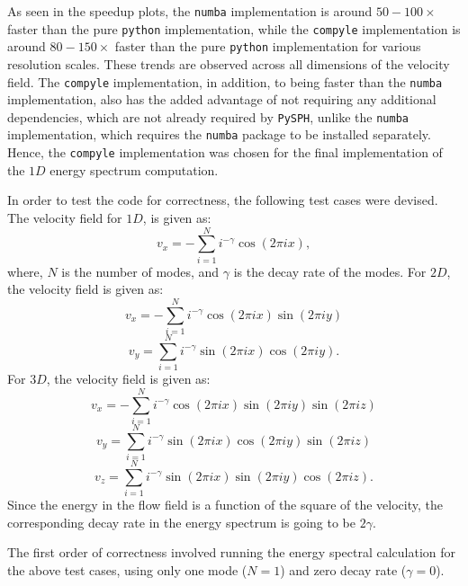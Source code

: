 As seen in the speedup plots, the \texttt{numba} implementation is around $50-100\times$ faster than the pure \texttt{python} implementation, while the \texttt{compyle} implementation is around $80-150\times$ faster than the pure \texttt{python} implementation for various resolution scales. These trends are observed across all dimensions of the velocity field. The \texttt{compyle} implementation, in addition, to being faster than the \texttt{numba} implementation, also has the added advantage of not requiring any additional dependencies, which are not already required by \texttt{PySPH}, unlike the \texttt{numba} implementation, which requires the \texttt{numba} package to be installed separately. Hence, the \texttt{compyle} implementation was chosen for the final implementation of the $1D$ energy spectrum computation.

In order to test the code for correctness, the following test cases were devised. The velocity field for $1D$, is given as:
\begin{equation}
    v_x = - \sum_{i=1}^{N} i^{-\gamma} \cos(2 \pi i x),
\end{equation}
where, $N$ is the number of modes, and $\gamma$ is the decay rate of the modes.
For $2D$, the velocity field is given as:
\begin{equation}
    v_x = - \sum_{i=1}^{N} i^{-\gamma} \cos(2 \pi i x) \sin(2 \pi i y)
\end{equation}
\begin{equation}
    v_y = \sum_{i=1}^{N} i^{-\gamma} \sin(2 \pi i x) \cos(2 \pi i y).
\end{equation}
For $3D$, the velocity field is given as:
\begin{equation}
    v_x = - \sum_{i=1}^{N} i^{-\gamma} \cos(2 \pi i x) \sin(2 \pi i y) \sin(2 \pi i z)
\end{equation}
\begin{equation}
    v_y = \sum_{i=1}^{N} i^{-\gamma} \sin(2 \pi i x) \cos(2 \pi i y) \sin(2 \pi i z)
\end{equation}
\begin{equation}
    v_z = \sum_{i=1}^{N} i^{-\gamma} \sin(2 \pi i x) \sin(2 \pi i y) \cos(2 \pi i z).
\end{equation}
Since the energy in the flow field is a function of the square of the velocity, the corresponding decay rate in the energy spectrum is going to be $2\gamma$.

The first order of correctness involved running the energy spectral calculation for the above test cases, using only one mode ($N=1$) and zero decay rate ($\gamma=0$).

